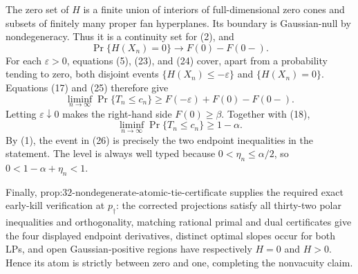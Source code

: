 The zero set of \(H\) is a finite union of interiors of full-dimensional zero cones and subsets of finitely many proper fan hyperplanes.  Its boundary is Gaussian-null by nondegeneracy.  Thus it is a continuity set for (2), and
\[
\Pr\{H(X_n)=0\}\longrightarrow F(0)-F(0-).
\tag{25}
\]
For each \(\varepsilon>0\), equations (5), (23), and (24) cover, apart from a probability tending to zero, both disjoint events \(\{H(X_n)\leq-\varepsilon\}\) and \(\{H(X_n)=0\}\).  Equations (17) and (25) therefore give
\[
\liminf_{n\to\infty}\Pr\{T_n\leq c_n\}
\geq F(-\varepsilon)+F(0)-F(0-).
\]
Letting \(\varepsilon\downarrow0\) makes the right-hand side \(F(0)\geq\beta\).  Together with (18),
\[
\liminf_{n\to\infty}\Pr\{T_n\leq c_n\}\geq1-\alpha.
\tag{26}
\]
By (1), the event in (26) is precisely the two endpoint inequalities in the statement.  The level is always well typed because \(0<\eta_n\leq\alpha/2\), so \(0<1-\alpha+\eta_n<1\).

Finally, \(\text{prop:32-nondegenerate-atomic-tie-certificate}\) supplies the required exact early-kill verification at \(p_\dagger\): the corrected projections satisfy all thirty-two polar inequalities and orthogonality, matching rational primal and dual certificates give the four displayed endpoint derivatives, distinct optimal slopes occur for both LPs, and open Gaussian-positive regions have respectively \(H=0\) and \(H>0\).  Hence its atom is strictly between zero and one, completing the nonvacuity claim.